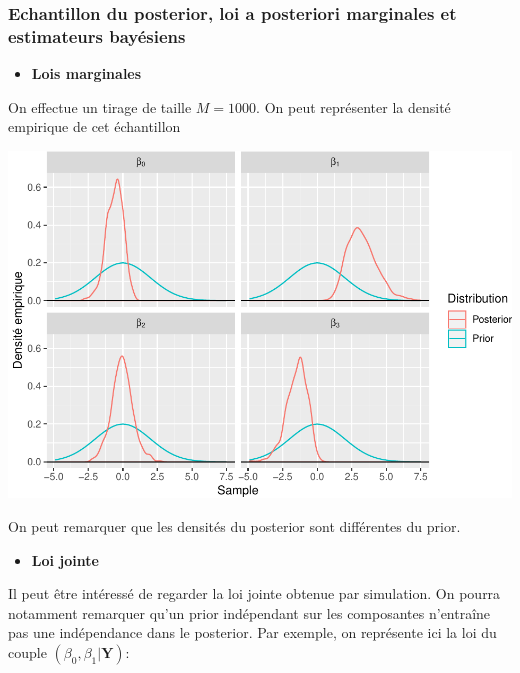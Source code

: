\documentclass[]{article}
\providecommand{\tightlist}{%
  \setlength{\itemsep}{0pt}\setlength{\parskip}{0pt}}
\begin{document}
\hypertarget{echantillon-du-posterior-loi-a-posteriori-marginales-et-estimateurs-bayuxe9siens}{%
\subsubsection{Echantillon du posterior, loi a posteriori marginales et
estimateurs
bayésiens}\label{echantillon-du-posterior-loi-a-posteriori-marginales-et-estimateurs-bayuxe9siens}}

\begin{itemize}
\tightlist
\item
  \textbf{Lois marginales}
\end{itemize}

On effectue un tirage de taille \(M = 1000\). On peut représenter la
densité empirique de cet échantillon

\includegraphics{chapitre_inference_bayesienne_files/figure-latex/plot_posterior_samples-1.pdf}

On peut remarquer que les densités du posterior sont différentes du
prior.

\begin{itemize}
\tightlist
\item
  \textbf{Loi jointe}
\end{itemize}

Il peut être intéressé de regarder la loi jointe obtenue par simulation.
On pourra notamment remarquer qu'un prior indépendant sur les
composantes n'entraîne pas une indépendance dans le posterior. Par
exemple, on représente ici la loi du couple
\((\beta_0,\beta_1 \vert \mathbf{Y})\):
\end{document}
